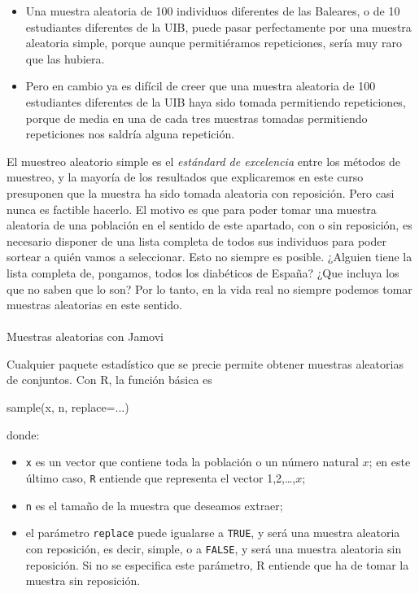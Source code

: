 \documentclass[
  spanish,
  letterpaper,
  DIV=11,
  numbers=noendperiod]{scrreprt}
\makeatletter
\let\oldparagraph\paragraph
\renewcommand{\paragraph}{
    \@ifstar
      \xxxParagraphStar
      \xxxParagraphNoStar
  }
\newcommand{\xxxParagraphStar}[1]{\oldparagraph*{#1}\mbox{}}
\newcommand{\xxxParagraphNoStar}[1]{\oldparagraph{#1}\mbox{}}
\newenvironment{Shaded}{\begin{snugshade}}{\end{snugshade}}
\newcommand{\AttributeTok}[1]{\textcolor[rgb]{0.40,0.45,0.13}{#1}}
\newcommand{\FunctionTok}[1]{\textcolor[rgb]{0.28,0.35,0.67}{#1}}
\newcommand{\NormalTok}[1]{\textcolor[rgb]{0.00,0.23,0.31}{#1}}
\makeatother
\begin{document}
\begin{itemize}
\item
  Una muestra aleatoria de 100 individuos diferentes de las Baleares, o
  de 10 estudiantes diferentes de la UIB, puede pasar perfectamente por
  una muestra aleatoria simple, porque aunque permitiéramos
  repeticiones, sería muy raro que las hubiera.
\item
  Pero en cambio ya es difícil de creer que una muestra aleatoria de 100
  estudiantes diferentes de la UIB haya sido tomada permitiendo
  repeticiones, porque de media en una de cada tres muestras tomadas
  permitiendo repeticiones nos saldría alguna repetición.
\end{itemize}

El muestreo aleatorio simple es el \emph{estándard de excelencia} entre
los métodos de muestreo, y la mayoría de los resultados que explicaremos
en este curso presuponen que la muestra ha sido tomada aleatoria con
reposición. Pero casi nunca es factible hacerlo. El motivo es que para
poder tomar una muestra aleatoria de una población en el sentido de este
apartado, con o sin reposición, es necesario disponer de una lista
completa de todos sus individuos para poder sortear a quién vamos a
seleccionar. Esto no siempre es posible. ¿Alguien tiene la lista
completa de, pongamos, todos los diabéticos de España? ¿Que incluya los
que no saben que lo son? Por lo tanto, en la vida real no siempre
podemos tomar muestras aleatorias en este sentido.

\paragraph{Muestras aleatorias con
Jamovi}\label{muestras-aleatorias-con-jamovi}

Cualquier paquete estadístico que se precie permite obtener muestras
aleatorias de conjuntos. Con R, la función básica es

\begin{Shaded}
\begin{Highlighting}[]
\FunctionTok{sample}\NormalTok{(x, n, }\AttributeTok{replace=}\NormalTok{...)}
\end{Highlighting}
\end{Shaded}

donde:

\begin{itemize}
\item
  \texttt{x} es un vector que contiene toda la población o un número
  natural \(x\); en este último caso, \texttt{R} entiende que representa
  el vector 1,2,\ldots,\(x\);
\item
  \texttt{n} es el tamaño de la muestra que deseamos extraer;
\item
  el parámetro \texttt{replace} puede igualarse a \texttt{TRUE}, y será
  una muestra aleatoria con reposición, es decir, simple, o a
  \texttt{FALSE}, y será una muestra aleatoria sin reposición. Si no se
  especifica este parámetro, R entiende que ha de tomar la muestra sin
  reposición.
\end{itemize}
\end{document}
